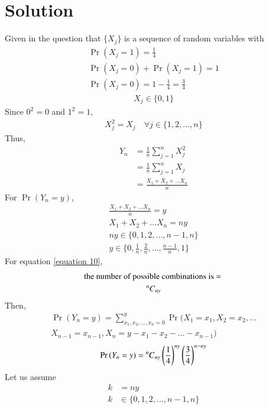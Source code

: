 \documentclass[journal,12pt,twocolumn]{IEEEtran}
\begin{document}
\section*{Solution}
Given in the question that $\{X_j\}$ is a sequence of random variables with
\begin{align}
    \Pr{(X_j=1)} = \frac{1}{4}
    \\\Pr{(X_j=0)} + \Pr{(X_j=1)} = 1
    \\\Pr{(X_j=0)} = 1 - \frac{1}{4} = \frac{3}{4}
\end{align}
\begin{align}
    X_j \in \{0,1\} \label{equation 4}
\end{align}
Since $0^2 = 0$ and $1^2 = 1$, 
\begin{align}
    X_j^2 = X_j \quad \forall j \in \{1, 2,\hdots, n\}
\end{align}
Thus, 
\begin{align}
    Y_n &= \frac{1}{n} \sum_{j=1}^{n}X_j^2 
    \\&= \frac{1}{n} \sum_{j=1}^{n}X_j
    \\&= \frac{X_1 + X_2 + \hdots X_n}{n}
\end{align}
For $\Pr{(Y_n = y)}$,
\begin{align}
    \frac{X_1 + X_2 + \hdots X_n}{n} = y
    \\X_1 + X_2 + \hdots X_n = ny \label{equation 10}
    \\ny \in \{0,1,2,\hdots,n-1,n\}
    \\y \in \{0, \frac{1}{n}, \frac{2}{n},\hdots,\frac{n-1}{n}, 1\}
\end{align}
For equation \ref{equation 10}, 
\begin{multline}
    \text{the number of possible combinations is = } 
    \\\comb[n]{ny}
\end{multline}
Then,
\begin{multline}
    \Pr{(Y_n = y)} = \sum_{x_1,x_2,\hdots,x_n=0}^{y} \Pr(X_1=x_1, X_2=x_2,\hdots \\ X_{n-1}=x_{n-1},X_n=y-x_1-x_2-\hdots-x_{n-1})
\end{multline}
\begin{align}
    \Pr{(Y_n = y)} = \comb[n]{ny} \brak{\frac{1}{4}}^{ny} \brak{\frac{3}{4}}^{n-ny}
\end{align}
Let us assume
\begin{align}
    k &= ny
    \\k&\in \{0,1,2,\hdots,n-1,n\}
\end{align}
\end{document}
